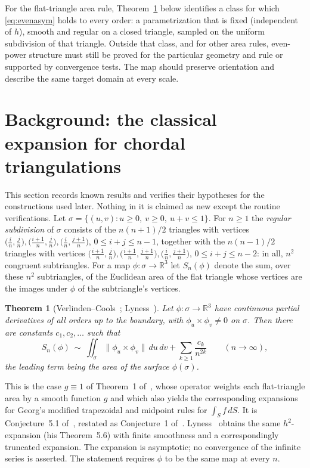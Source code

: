 \documentclass[11pt]{article}
\newtheorem{theorem}{Theorem}
\theoremstyle{remark}
\newcommand{\R}{\mathbb{R}}
\begin{document}
For the flat-triangle area rule, Theorem~\ref{thm:classical} below identifies a class for which
\eqref{eq:evenasym} holds to every order: a parametrization that is fixed (independent of
$h$), smooth and regular on a closed triangle, sampled on the uniform subdivision of that
triangle. Outside that class, and for other area rules, even-power structure must still be
proved for the particular geometry and rule or supported by convergence tests. The map should
preserve orientation and describe the same target domain at every scale.

\section{Background: the classical expansion for chordal triangulations}\label{sec:classical}
This section records known results and verifies their hypotheses for the constructions
used later. Nothing in it is claimed as new except the routine verifications.
Let $\sigma=\{(u,v):u\ge0,\ v\ge0,\ u+v\le1\}$. For $n\ge1$ the \emph{regular subdivision}
of $\sigma$ consists of the $n(n+1)/2$ triangles with vertices
$\bigl(\tfrac in,\tfrac jn\bigr),\bigl(\tfrac{i+1}n,\tfrac jn\bigr),\bigl(\tfrac in,\tfrac{j+1}n\bigr)$,
$0\le i+j\le n-1$, together with the $n(n-1)/2$ triangles with vertices
$\bigl(\tfrac{i+1}n,\tfrac jn\bigr),\bigl(\tfrac{i+1}n,\tfrac{j+1}n\bigr),\bigl(\tfrac in,\tfrac{j+1}n\bigr)$,
$0\le i+j\le n-2$: in all, $n^2$ congruent subtriangles. For a map $\phi:\sigma\to\R^3$ let
$S_n(\phi)$ denote the sum, over these $n^2$ subtriangles, of the Euclidean area of the flat
triangle whose vertices are the images under $\phi$ of the subtriangle's vertices.

\begin{theorem}[Verlinden--Cools~\cite{verlindencools}; Lyness~\cite{lyness94}]
\label{thm:classical}
Let $\phi:\sigma\to\R^3$ have continuous partial derivatives of all orders up to the boundary,
with $\phi_u\times\phi_v\neq0$ on $\sigma$. Then there are constants $c_1,c_2,\dots$ such that
\begin{equation}\label{eq:classical}
S_n(\phi)\ \sim\ \iint_\sigma\|\phi_u\times\phi_v\|\,du\,dv+\sum_{k\ge1}\frac{c_k}{n^{2k}}
\qquad(n\to\infty),
\end{equation}
the leading term being the area of the surface $\phi(\sigma)$.
\end{theorem}

This is the case $g\equiv1$ of Theorem~1 of~\cite{verlindencools}, whose operator weights each
flat-triangle area by a smooth function $g$ and which also yields the corresponding
expansions for Georg's modified trapezoidal and midpoint rules for $\int_S f\,dS$. It is
Conjecture~5.1 of~\cite{georg91}, restated as Conjecture~1 of~\cite{georgtausch}.
Lyness~\cite{lyness94} obtains the same $h^2$-expansion (his Theorem~5.6) with finite
smoothness and a correspondingly truncated expansion. The expansion is asymptotic; no
convergence of the infinite series is asserted. The statement requires $\phi$ to be the same
map at every $n$.
\end{document}
